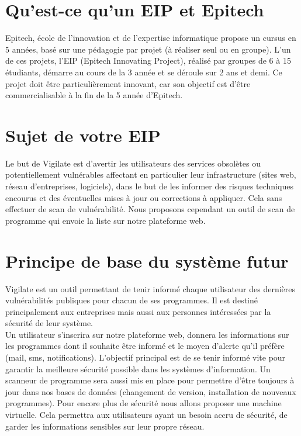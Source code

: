 \section{Qu'est-ce qu’un EIP et Epitech}
Epitech, école de l'innovation et de l'expertise informatique propose un cursus en 5 années, basé sur une pédagogie par projet (à réaliser seul ou en groupe). L'un de ces projets, l’EIP (Epitech Innovating Project), réalisé par groupes de 6 à 15 étudiants, démarre au cours de la 3\ieme{} année et se déroule sur 2 ans et demi. Ce projet doit être particulièrement innovant, car son objectif est d’être commercialisable à la fin de la 5\ieme{} année d’Epitech.

\section{Sujet de votre EIP}
Le but de Vigilate est d’avertir les utilisateurs des services obsolètes ou potentiellement vulnérables affectant en particulier leur infrastructure (sites web, réseau d'entreprises, logiciels), dans le but de les informer des risques techniques encourus et des éventuelles mises à jour ou corrections à appliquer.
Cela sans effectuer de scan de vulnérabilité.
Nous proposons cependant un outil de scan de programme qui envoie la liste sur notre plateforme web.

\section{Principe de base du système futur}
Vigilate est un outil permettant de tenir informé chaque utilisateur des dernières vulnérabilités publiques pour chacun de ses programmes. Il est destiné principalement aux entreprises mais aussi aux personnes intéressées par la sécurité de leur système.\\
Un utilisateur s’inscrira sur notre plateforme web, donnera les informations sur les programmes dont il souhaite être informé et le moyen d’alerte qu’il préfère (mail, sms, notifications). L’objectif principal est de se tenir informé vite pour garantir la meilleure sécurité possible dans les systèmes d’information. Un scanneur de programme sera aussi mis en place pour permettre d’être toujours à jour dans nos bases de données (changement de version, installation de nouveaux programmes). Pour encore plus de sécurité nous allons proposer une machine virtuelle. Cela permettra aux utilisateurs ayant un besoin accru de sécurité, de garder les informations sensibles sur leur propre réseau.

